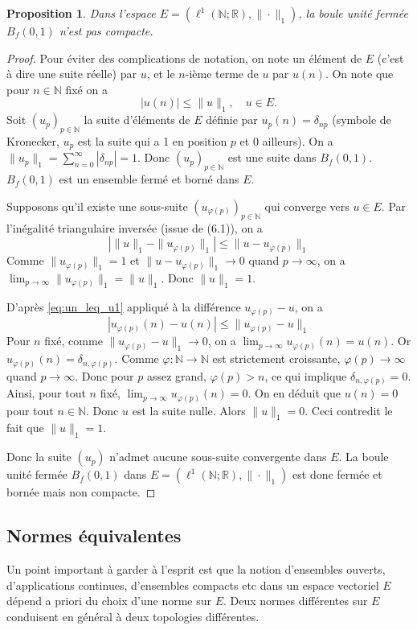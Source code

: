 \documentclass{article}
\newtheorem{proposition}[theorem]{Proposition}
\newcommand{\R}{\mathbb{R}}
\newcommand{\N}{\mathbb{N}}
\begin{document}
\begin{proposition} \label{prop:l1_non_compact}
Dans l'espace $E = (\ell^1(\N; \R), \|\cdot\|_1)$, la boule unité fermée $B_f(0, 1)$ n'est pas compacte.
\end{proposition}

\begin{proof}
Pour éviter des complications de notation, on note un élément de $E$ (c'est à dire une suite réelle) par $u$, et le $n$-ième terme de $u$ par $u(n)$. On note que pour $n \in \N$ fixé on a
\begin{equation} \label{eq:un_leq_u1}
|u(n)| \leq \|u\|_1, \quad u \in E.
\end{equation}
Soit $(u_p)_{p \in \N}$ la suite d'éléments de $E$ définie par $u_p(n) = \delta_{np}$ (symbole de Kronecker, $u_p$ est la suite qui a 1 en position $p$ et 0 ailleurs). On a $\|u_p\|_1 = \sum_{n=0}^\infty |\delta_{np}| = 1$. Donc $(u_p)_{p \in \N}$ est une suite dans $B_f(0, 1)$. $B_f(0,1)$ est un ensemble fermé et borné dans $E$.

Supposons qu'il existe une sous-suite $(u_{\varphi(p)})_{p \in \N}$ qui converge vers $u \in E$. Par l'inégalité triangulaire inversée (issue de (6.1)), on a
\[ | \|u\|_1 - \|u_{\varphi(p)}\|_1 | \leq \|u - u_{\varphi(p)}\|_1 \]
Comme $\|u_{\varphi(p)}\|_1 = 1$ et $\|u - u_{\varphi(p)}\|_1 \to 0$ quand $p \to \infty$, on a $\lim_{p \to \infty} \|u_{\varphi(p)}\|_1 = \|u\|_1$. Donc $\|u\|_1 = 1$.

D'après \eqref{eq:un_leq_u1} appliqué à la différence $u_{\varphi(p)} - u$, on a
\[ |u_{\varphi(p)}(n) - u(n)| \leq \|u_{\varphi(p)} - u\|_1 \]
Pour $n$ fixé, comme $\|u_{\varphi(p)} - u\|_1 \to 0$, on a $\lim_{p \to \infty} u_{\varphi(p)}(n) = u(n)$.
Or $u_{\varphi(p)}(n) = \delta_{n, \varphi(p)}$. Comme $\varphi: \N \to \N$ est strictement croissante, $\varphi(p) \to \infty$ quand $p \to \infty$. Donc pour $p$ assez grand, $\varphi(p) > n$, ce qui implique $\delta_{n, \varphi(p)} = 0$.
Ainsi, pour tout $n$ fixé, $\lim_{p \to \infty} u_{\varphi(p)}(n) = 0$.
On en déduit que $u(n) = 0$ pour tout $n \in \N$. Donc $u$ est la suite nulle.
Alors $\|u\|_1 = 0$. Ceci contredit le fait que $\|u\|_1 = 1$.

Donc la suite $(u_p)$ n'admet aucune sous-suite convergente dans $E$. La boule unité fermée $B_f(0, 1)$ dans $E = (\ell^1(\N; \R), \|\cdot\|_1)$ est donc fermée et bornée mais non compacte.
\end{proof}

\subsection{Normes équivalentes}
Un point important à garder à l'esprit est que la notion d'ensembles ouverts, d'applications continues, d'ensembles compacts etc dans un espace vectoriel $E$ dépend a priori du choix d'une norme sur $E$. Deux normes différentes sur $E$ conduisent en général à deux topologies différentes.
\end{document}

